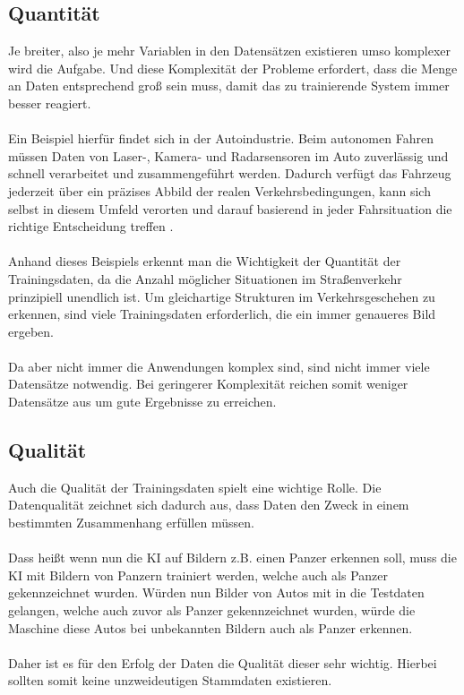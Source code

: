 \documentclass[12pt,oneside,a4paper,parskip]{scrbook}
\begin{document}
\subsection{Quantität}
\label{section:DataQuantity}
Je breiter, also je mehr Variablen in den Datensätzen existieren umso komplexer wird die Aufgabe. Und diese Komplexität der Probleme erfordert, dass die Menge an Daten entsprechend groß sein muss, damit das zu trainierende System immer besser reagiert.
\\\\
Ein Beispiel hierfür findet sich in der Autoindustrie. Beim autonomen Fahren müssen Daten von Laser-, Kamera- und Radarsensoren im Auto zuverlässig und schnell verarbeitet und zusammengeführt werden. Dadurch verfügt das Fahrzeug jederzeit über ein präzises Abbild der realen Verkehrsbedingungen, kann sich selbst in diesem Umfeld verorten und darauf basierend in jeder Fahrsituation die richtige Entscheidung treffen \cite{autonomesFahren}.
\\\\
Anhand dieses Beispiels erkennt man die Wichtigkeit der Quantität der Trainingsdaten, da die Anzahl möglicher Situationen im Straßenverkehr prinzipiell unendlich ist. Um gleichartige Strukturen im Verkehrsgeschehen zu erkennen, sind viele Trainingsdaten erforderlich, die ein immer genaueres Bild ergeben.
\\\\
Da aber nicht immer die Anwendungen komplex sind, sind nicht immer viele Datensätze notwendig. Bei geringerer Komplexität reichen somit weniger Datensätze aus um gute Ergebnisse zu erreichen.

\subsection{Qualität}
\label{section:DataQuality}
Auch die Qualität der Trainingsdaten spielt eine wichtige Rolle. Die Datenqualität zeichnet sich dadurch aus, dass Daten den Zweck in einem bestimmten Zusammenhang erfüllen müssen. \\\\
Dass heißt wenn nun die KI auf Bildern z.B. einen Panzer erkennen soll\cite{panzer}, muss die KI mit Bildern von Panzern trainiert werden, welche auch als Panzer gekennzeichnet wurden.
Würden nun Bilder von Autos mit in die Testdaten gelangen, welche auch zuvor als Panzer gekennzeichnet wurden, würde die Maschine diese Autos bei unbekannten Bildern auch als Panzer erkennen.
\\\\
Daher ist es für den Erfolg der Daten die Qualität dieser sehr wichtig. Hierbei sollten somit keine unzweideutigen Stammdaten existieren.
\end{document}

